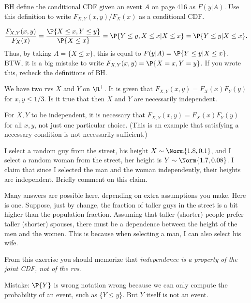 \begin{exercise}
BH define the conditional CDF given an event $A$ on page 416 as $F(y|A)$.
Use this definition to write $F_{X,Y}(x,y)/F_{X}(x)$ as a conditional CDF.
\begin{solution}
\begin{align}
\frac{F_{X,Y}(x,y)}{F_{X}(x)} = \frac{\P{X\leq x, Y\leq y}}{\P{X\leq x}}
  = \P{Y\leq y, X\leq x|X\leq x} = \P{Y\leq y|X\leq x}.
\end{align}
Thus, by taking $A=\{X\leq x\}$, this is equal to  $F(y|A) = \P{Y\leq y | X\leq x}$.
BTW, it is a big mistake to write $F_{X,Y}(x,y) = \P{X=x, Y=y}$. If you wrote this, recheck the definitions of BH.
\end{solution}
\end{exercise}


\begin{exercise}
We have two rvs $X$ and $Y$ on $\R^{+}$.
It is given that $F_{X,Y}(x,y) = F_X(x)F_Y(y)$ for $x,y \leq 1/3$.
Is it true that then $X$ and $Y$ are necessarily independent.
\begin{solution}
For $X, Y$ to be independent, it is necessary that  $F_{X,Y}(x,y) = F_X(x)F_Y(y)$ for all $x,y$, not just one particular choice. (This is an example that satisfying a necessary condition is not necessarily sufficient.)
\end{solution}
\end{exercise}

\begin{exercise}
I select a random guy from the street, his height $X\sim\Norm{1.8, 0.1}$, and I select a random woman from the street, her height is $Y\sim\Norm{1.7, 0.08}$.
I claim that since I selected the man and the woman independently, their heights are independent.
Briefly comment on this claim.


\begin{solution}
  Many answers are possible here, depending on extra assumptions you make.
  Here is one.
  Suppose, just by change, the fraction of taller guys in the street is a bit higher than the population fraction.
  Assuming that taller (shorter) people prefer taller (shorter) spouses, there must be a dependence between the height of the men and the women. This is because when selecting a man, I can also select his wife.

From this exercise you should memorize that \emph{independence is a property of the joint CDF, not of the rvs}.

Mistake:   $\P{Y}$ is wrong notation wrong because we can only compute the probability of an event, such as $\{Y\leq y\}$. But $Y$ itself is not an event. \end{solution}
\end{exercise}


